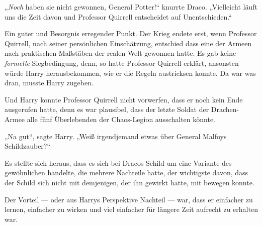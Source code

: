 „\emph{Noch} haben sie nicht gewonnen, General Potter!“ knurrte Draco.
„Vielleicht läuft uns die Zeit davon und Professor Quirrell entscheidet auf Unentschieden.“

Ein guter und Besorgnis erregender Punkt. Der Krieg endete erst, wenn Professor Quirrell, nach seiner persönlichen Einschätzung, entschied dass eine der Armeen nach praktischen Maßstäben der realen Welt gewonnen hatte. Es gab keine \emph{formelle} Siegbedingung, denn, so hatte Professor Quirrell erklärt, ansonsten würde Harry herausbekommen, wie er die Regeln austricksen konnte. Da war was dran, musste Harry zugeben.

Und Harry konnte Professor Quirrell nicht vorwerfen, dass er noch kein Ende ausgerufen hatte, denn es war plausibel, dass der letzte Soldat der Drachen-Armee alle fünf Überlebenden der Chaos-Legion ausschalten könnte.

„Na gut“, sagte Harry.
„Weiß irgendjemand etwas über General Malfoys Schildzauber?“

Es stellte sich heraus, dass es sich bei Dracos Schild um eine Variante des gewöhnlichen  handelte, die mehrere Nachteile hatte, der wichtigste davon, dass der Schild sich nicht mit demjenigen, der ihn gewirkt hatte, mit bewegen konnte.

Der Vorteil — oder aus Harrys Perspektive Nachteil — war, dass er einfacher zu lernen, einfacher zu wirken und viel einfacher für längere Zeit aufrecht zu erhalten war.

